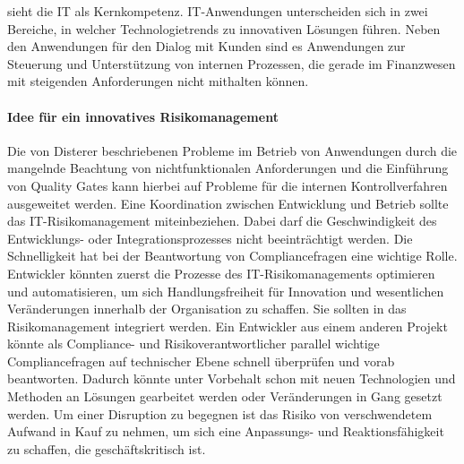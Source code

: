 \citet{Bussmann2006} sieht die IT als Kernkompetenz. IT-Anwendungen unterscheiden sich in zwei Bereiche, in welcher Technologietrends zu innovativen Lösungen führen. Neben den Anwendungen für den Dialog mit Kunden sind es Anwendungen zur Steuerung und Unterstützung von internen Prozessen, die gerade im Finanzwesen mit steigenden Anforderungen nicht mithalten können.

\paragraph{Idee für ein innovatives Risikomanagement}
Die von Disterer beschriebenen Probleme im Betrieb von Anwendungen durch die mangelnde Beachtung von nichtfunktionalen Anforderungen und die Einführung von Quality Gates \cite{mci/Disterer2011} kann hierbei auf Probleme für die internen Kontrollverfahren ausgeweitet werden. Eine Koordination zwischen Entwicklung und Betrieb sollte das IT-Risikomanagement miteinbeziehen. Dabei darf die Geschwindigkeit des Entwicklungs- oder Integrationsprozesses nicht beeinträchtigt werden. Die Schnelligkeit hat bei der Beantwortung von Compliancefragen eine wichtige Rolle. Entwickler könnten zuerst die Prozesse des IT-Risikomanagements optimieren und automatisieren, um sich Handlungsfreiheit für Innovation und wesentlichen Veränderungen innerhalb der Organisation zu schaffen. Sie sollten in das Risikomanagement integriert werden. Ein Entwickler aus einem anderen Projekt könnte als Compliance- und Risikoverantwortlicher parallel wichtige Compliancefragen auf technischer Ebene schnell überprüfen und vorab beantworten. Dadurch könnte unter Vorbehalt schon mit neuen Technologien und Methoden an Lösungen gearbeitet werden oder Veränderungen in Gang gesetzt werden. Um einer Disruption zu begegnen ist das Risiko von verschwendetem Aufwand in Kauf zu nehmen, um sich eine Anpassungs- und Reaktionsfähigkeit zu schaffen, die geschäftskritisch ist.


